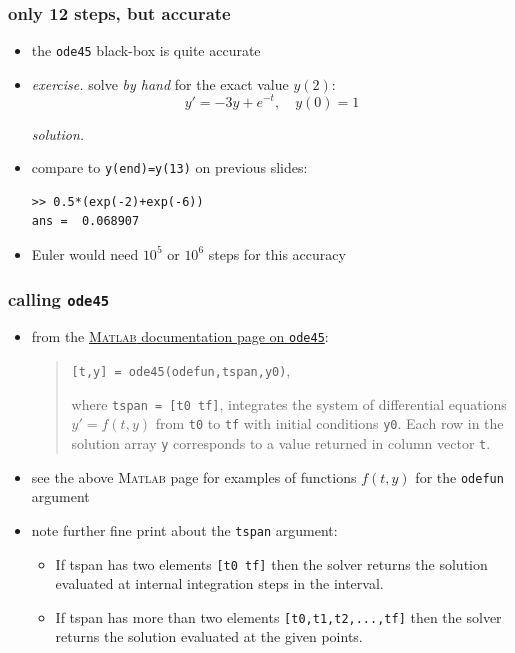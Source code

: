 \documentclass[dvipsnames,colorlinks]{beamer}
\newcommand{\Matlab}{\textsc{Matlab}\xspace}
\begin{document}
\begin{frame}[fragile]
\frametitle{only 12 steps, but accurate}

\begin{itemize}
\item the \texttt{ode45} black-box is quite accurate
\item \emph{exercise.} solve \emph{by hand} for the exact value $y(2)$:
    $$y' = - 3 y + e^{-t}, \quad y(0)=1$$

\noindent \emph{solution.}

\vspace{30mm}
\item compare to \texttt{y(end)=y(13)} on previous slides:

\begin{Verbatim}
>> 0.5*(exp(-2)+exp(-6))
ans =  0.068907
\end{Verbatim}
\item Euler would need $10^5$ or $10^6$ steps for this accuracy
\end{itemize}
\end{frame}


\begin{frame}[fragile]
\frametitle{calling \texttt{ode45}}

\begin{itemize}
\item from the \href{https://www.mathworks.com/help/matlab/ref/ode45.html}{\Matlab documentation page on \texttt{ode45}}:

\medskip
\begin{quote}\normalfont
\texttt{[t,y] = ode45(odefun,tspan,y0)},

\medskip
where \texttt{tspan = [t0 tf]}, integrates the system of differential equations $y'=f(t,y)$ from \texttt{t0} to \texttt{tf} with initial conditions \texttt{y0}. Each row in the solution array \texttt{y} corresponds to a value returned in column vector \texttt{t}.
\end{quote}
\item see the above \Matlab page for examples of functions $f(t,y)$ for the \texttt{odefun} argument
\item note further fine print about the \texttt{tspan} argument:
   \begin{itemize}
   \footnotesize
   \item If tspan has two elements \texttt{[t0 tf]} then the solver returns the solution evaluated at internal integration steps in the interval.
   \item If tspan has more than two elements \texttt{[t0,t1,t2,...,tf]} then the solver returns the solution evaluated at the given points.
   \end{itemize}
\end{itemize}
\end{frame}
\end{document}
